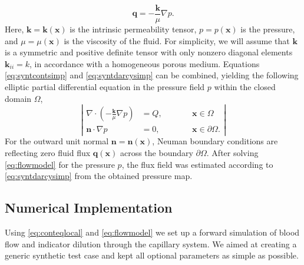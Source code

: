 \documentclass[journal,twocolumn]{IEEEtran}
\newcommand{\vq}{\mathbf{q}}
\newcommand{\vx}{\mathbf{x}}
\begin{document}
	\begin{equation}
		\vq = -\frac{\mathbf{k}}{\mu} \nabla p.
		\label{eq:syntdarcysimp}
	\end{equation}
	Here, $\mathbf{k} = \mathbf{k}(\vx)$ is the intrinsic permeability tensor, $p=p(\vx)$ is the pressure, and $\mu = \mu(\vx)$ is the viscosity of the fluid. 	
	For simplicity, we will assume that $\mathbf{k}$ is a symmetric and positive definite tensor with only nonzero diagonal elements $\mathbf{k}_{ii} = k$, in accordance with a homogeneous porous medium.	
	Equations \eqref{eq:syntcontsimp} and \eqref{eq:syntdarcysimp} can be combined, yielding the following elliptic partial differential equation in the pressure field $p$ within the closed domain $\Omega$,
	\begin{equation}
		\left\vert
		\begin{alignedat}{2}
			\nabla \cdot \left( -\frac{\mathbf{k}}{\mu} \nabla p \right) &= Q,  \qquad &&\vx \in \Omega \\
			\mathbf{n} \cdot \nabla p &=0, &&\vx \in \partial \Omega.
		\end{alignedat}
		\right\vert 
		\label{eq:flowmodel}
	\end{equation}
	For the outward unit normal $\mathbf{n}=\mathbf{n}(\vx)$, Neuman boundary conditions are reflecting zero fluid flux $\vq(\vx)$ across the boundary $\partial \Omega$.
	After solving \eqref{eq:flowmodel} for the pressure $p$, the flux field was estimated according to \eqref{eq:syntdarcysimp} from the obtained pressure map. 

	

	
	
		
	\subsection{Numerical Implementation}\label{sec:NumExp}
	Using \eqref{eq:conteqlocal} and \eqref{eq:flowmodel} we set up a forward simulation of blood flow and indicator dilution through the capillary system.
	We aimed at creating a generic synthetic test case and kept all optional parameters as simple as possible. 
\end{document}
